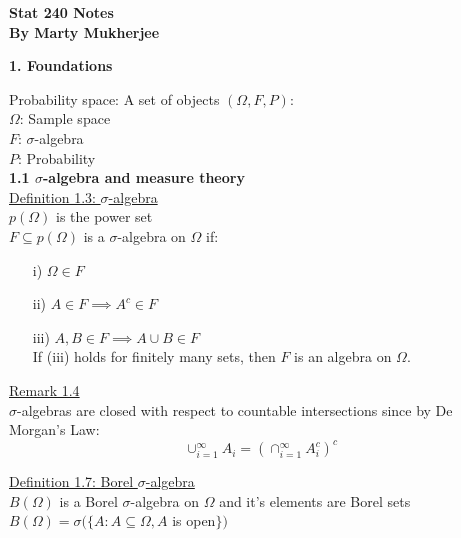 \documentclass[10pt,letterpaper]{article}
\begin{document}
\noindent \begin{center}
\textbf{\large{}Stat 240 Notes\\By Marty Mukherjee}\vspace{5mm}
\par\end{center}{\large \par}

\begin{center}
\textbf{1. Foundations}
\end{center}

Probability space: A set of objects $(\Omega, F, P)$:\\

$\Omega$: Sample space\\

$F$: $\sigma $-algebra\\

$P$: Probability\\

\textbf{1.1 $\sigma$-algebra and measure theory}\\

\underline{Definition 1.3: $\sigma$-algebra}\\

$p(\Omega)$ is the power set\\

$F\subseteq p(\Omega)$ is a $\sigma$-algebra on $\Omega$ if:

\begin{enumerate}
\item[i)] $\Omega \in F$
\item[ii)] $A\in F\implies A^c\in F$
\item[iii)] $A, B\in F\implies A\cup B\in F$\\
If (iii) holds for finitely many sets, then $F$ is an algebra on $\Omega$.
\end{enumerate}

\underline{Remark 1.4}\\

$\sigma$-algebras are closed with respect to countable intersections since by De Morgan's Law:
$$\cup_{i=1}^{\infty}A_i = (\cap_{i=1}^{\infty}A_i^c)^c$$

\underline{Definition 1.7: Borel $\sigma$-algebra}\\

$B(\Omega)$ is a Borel $\sigma$-algebra on $\Omega$ and it's elements are Borel sets\\

$B(\Omega) = \sigma (\{A: A\subseteq\Omega, A$ is open$\})$\\
\end{document}
